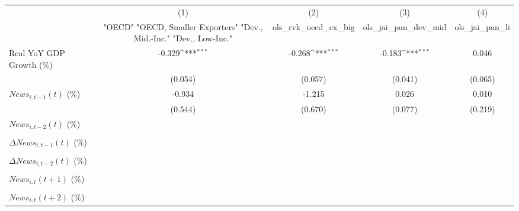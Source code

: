 {
\def\sym#1{\ifmmode^{#1}\else\(^{#1}\)\fi}
\begin{tabular}{l*{4}{c}}
\toprule
                    &\multicolumn{1}{c}{(1)}&\multicolumn{1}{c}{(2)}&\multicolumn{1}{c}{(3)}&\multicolumn{1}{c}{(4)}\\
                    &\multicolumn{1}{c}{ "OECD" "OECD, Smaller Exporters" "Dev., Mid.-Inc." "Dev., Low-Inc."}&\multicolumn{1}{c}{ols_rvk_oecd_ex_big}&\multicolumn{1}{c}{ols_jai_pan_dev_mid}&\multicolumn{1}{c}{ols_jai_pan_li}\\
\midrule
Real YoY GDP Growth (\%)&      -0.329\sym{***}&      -0.268\sym{***}&      -0.183\sym{***}&       0.046         \\
                    &     (0.054)         &     (0.057)         &     (0.041)         &     (0.065)         \\
\addlinespace
$ News_{i,t-1}(t)$ (\%)&      -0.934         &      -1.215         &       0.026         &       0.010         \\
                    &     (0.544)         &     (0.670)         &     (0.077)         &     (0.219)         \\
\addlinespace
$ News_{i,t-2}(t)$ (\%)&                     &                     &                     &                     \\
                    &                     &                     &                     &                     \\
\addlinespace
$ \Delta News_{i,t-1}(t)$ (\%)&                     &                     &                     &                     \\
                    &                     &                     &                     &                     \\
\addlinespace
$ \Delta News_{i,t-2}(t)$ (\%)&                     &                     &                     &                     \\
                    &                     &                     &                     &                     \\
\addlinespace
$ News_{i,t}(t+1)$ (\%)&                     &                     &                     &                     \\
                    &                     &                     &                     &                     \\
\addlinespace
$ News_{i,t}(t+2)$ (\%)&                     &                     &                     &                     \\

\end{tabular}}
